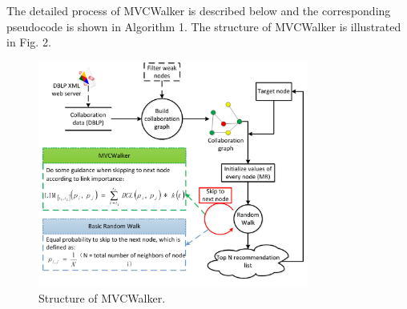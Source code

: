 \documentclass[10pt,journal,compsoc]{IEEEtran}
\begin{document}
The detailed process of MVCWalker is described below and the corresponding pseudocode is shown in Algorithm 1. The structure of MVCWalker is illustrated in Fig. 2.
\begin{figure}
\centering
\includegraphics [width=3.5in]{Fig2.pdf}
\caption{Structure of MVCWalker.}
\end{figure}
\end{document}
